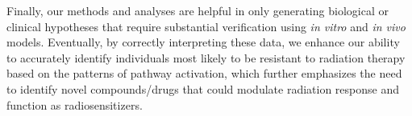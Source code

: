 \documentclass[hidelinks,11pt]{article}
\begin{document}
Finally, our methods and analyses are helpful in only generating biological or clinical hypotheses that require substantial verification using \emph{in vitro} and \emph{in vivo} models. Eventually, by correctly interpreting these data, we enhance our ability to accurately identify individuals most likely to be resistant to radiation therapy based on the patterns of pathway activation, which further emphasizes the need to identify novel compounds/drugs that could modulate radiation response and function as radiosensitizers.

\end{document}
